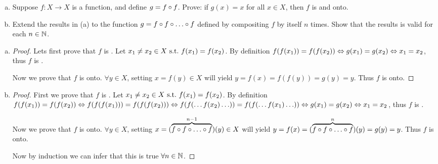 \begin{question}
	\begin{enumerate}[(a)]
		\item Suppose $f: X \rightarrow X$ is a function, and define $g=f \circ f$. Prove: if $g(x)=x$ for all $x \in X$, then $f$ is \oo and onto.
		\item Extend the results in (a) to the function $g = f \circ f \circ \hdots \circ f$ defined by compositing $f$ by itself $n$ times. Show that the results is valid for each $n \in \mathbb{N}$.
	\end{enumerate}
\end{question}

\begin{ans}
	\begin{enumerate}[(a)]
		\item 
		\begin{proof}
			Lets first prove that $f$ is \oo. Let $x_1 \neq x_2 \in X \ \text{s.t.}\  f(x_1) = f(x_2)$. By definition $f(f(x_1)) = f(f(x_2)) \Leftrightarrow g(x_1) = g(x_2) \Leftrightarrow x_1 = x_2$, thus $f$ is \oo.
			
			Now we prove that $f$ is onto. $\forall y \in X$, setting $x=f(y)\in X$ will yield $y = f(x) = f(f(y)) = g(y) = y$. Thus $f$ is onto.
		\end{proof}
		\item 
		\begin{proof}
			First we prove that $f$ is \oo.  Let $x_1 \neq x_2 \in X \ \text{s.t.}\  f(x_1) = f(x_2)$. By definition $f(f(x_1)) = f(f(x_2)) \Leftrightarrow f(f(f(x_1))) = f(f(f(x_2))) \Leftrightarrow  f(f(\hdots f(x_2) \hdots)) = f(f(\hdots f(x_1) \hdots)) \Leftrightarrow g(x_1) = g(x_2) \Leftrightarrow x_1 = x_2$, thus $f$ is \oo.
			
			Now we prove that $f$ is onto. $\forall y \in X$, setting $x=(\overbrace{f \circ f \circ \hdots \circ f}^{n-1})(y)\in X$ will yield $y = f(x) = (\overbrace{f \circ f \circ \hdots \circ f}^{n})(y) = g(y) = y$. Thus $f$ is onto.
			
			Now by induction we can infer that this is true $\forall n \in \mathbb{N}$.
		\end{proof}
	\end{enumerate}
\end{ans}
\newpage


